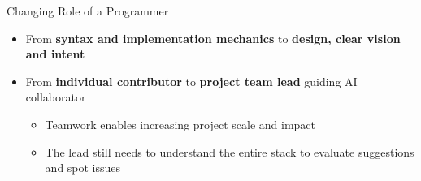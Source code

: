 \documentclass[xcolor={dvipsnames,table}, aspectratio=169]{beamer}
\begin{document}
\begin{frame}{Changing Role of a Programmer}
  \begin{itemize}
    \item<1-> From \textbf{syntax and implementation mechanics} to \textbf{design, clear vision and intent}
    \item<2-> From \textbf{individual contributor} to \textbf{project team lead} guiding AI collaborator
    \begin{itemize}
      \item<2-> Teamwork enables increasing project scale and impact
      \item<2-> The lead still needs to understand the entire stack to evaluate suggestions and spot issues
    \end{itemize}
  \end{itemize}
  
  \vspace{1em}

  \begin{columns}
    \begin{column}{0.6\textwidth}
    \end{column}
    
    \begin{column}{0.4\textwidth}
    \end{column}
    

\end{columns}
\end{frame}
\end{document}
